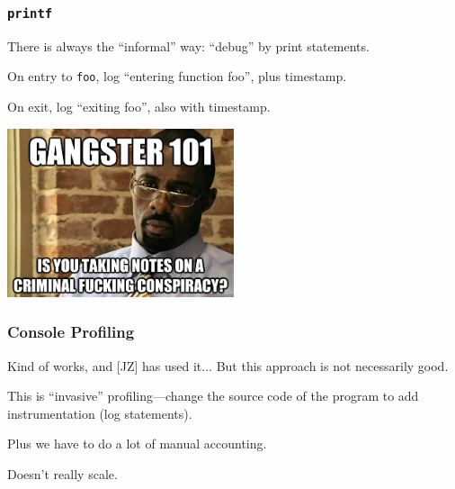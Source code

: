 \begin{frame}
\frametitle{\texttt{printf}}


\begin{changemargin}{1.5cm}
There is always the ``informal'' way: ``debug'' by print statements.

On entry to \texttt{foo}, log ``entering function foo'', plus timestamp.

On exit, log ``exiting foo'', also with timestamp.
\end{changemargin}

\begin{center}
	\includegraphics[width=0.5\textwidth]{images/stringerbell.jpg}
\end{center}

\end{frame}



\begin{frame}
\frametitle{Console Profiling}


\begin{changemargin}{1cm}
Kind of works, and [JZ] has used it... But this approach is not necessarily good.  

This is ``invasive'' profiling---change the source code of the program to add instrumentation (log statements). 

Plus we have to do a lot of manual accounting.

Doesn't really scale.
\end{changemargin}

\end{frame}

